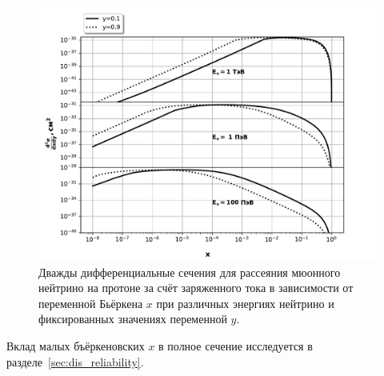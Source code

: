 \begin{figure}[!h]
\centering
\includegraphics[width=\linewidth]{images/NuProp/xs_vs_xCT18ZNNLO_cc_12_proton.pdf}
\caption{Дважды дифференциальные сечения для рассеяния мюонного нейтрино на протоне за счёт заряженного тока в зависимости от переменной Бьёркена $x$ при различных энергиях нейтрино и фиксированных значениях переменной $y$.}
\label{fig:xsec_2d}
\end{figure}

Вклад малых бъёркеновских $x$ в полное сечение исследуется в разделе~\ref{sec:dis_reliability}.
